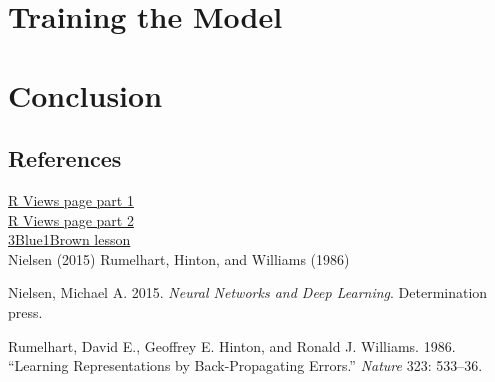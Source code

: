 \hypertarget{training-the-model}{%
\section{Training the Model}\label{training-the-model}}

\hypertarget{conclusion}{%
\section{Conclusion}\label{conclusion}}

\hypertarget{references}{%
\subsection{References}\label{references}}

\href{https://rviews.rstudio.com/2020/07/20/shallow-neural-net-from-scratch-using-r-part-1/}{R
Views page part 1}\\
\href{https://rviews.rstudio.com/2020/07/24/building-a-neural-net-from-scratch-using-r-part-2/}{R
Views page part 2}\\
\href{https://www.3blue1brown.com/lessons/backpropagation-calculus}{3Blue1Brown
lesson}\\
Nielsen (2015) Rumelhart, Hinton, and Williams (1986)

\hypertarget{refs}{}
\begin{CSLReferences}{1}{0}
\leavevmode{}%
Nielsen, Michael A. 2015. \emph{Neural Networks and Deep Learning}.
Determination press.

\leavevmode{}%
Rumelhart, David E., Geoffrey E. Hinton, and Ronald J. Williams. 1986.
{``Learning Representations by Back-Propagating Errors.''} \emph{Nature}
323: 533--36.

\end{CSLReferences}


